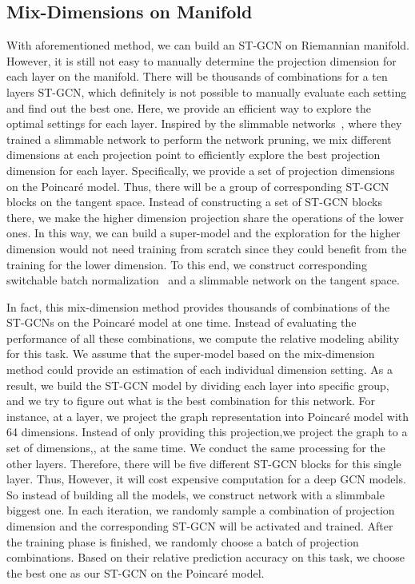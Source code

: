 \documentclass[letterpaper]{article} \usepackage{aaai19}  \usepackage{times}  \usepackage{helvet} \usepackage{courier}  \usepackage[hyphens]{url}  \usepackage{graphicx} \urlstyle{rm} \def\UrlFont{\rm}  \usepackage{graphicx}  \frenchspacing  \setlength{\pdfpagewidth}{8.5in}  \setlength{\pdfpageheight}{11in}
\begin{document}
\subsection{Mix-Dimensions on Manifold}

With aforementioned method, we can build an ST-GCN on Riemannian manifold. However, it is still not easy to manually determine the projection dimension for each layer on the manifold. There will be thousands of combinations for a ten layers ST-GCN, which definitely is not possible to manually evaluate each setting and find out the best one. Here, we provide an efficient way to explore the optimal settings for each layer. Inspired by the slimmable networks~\cite{yu2018slimmable}, where they trained a slimmable network to perform the network pruning, we mix different dimensions at each projection point to efficiently explore the best projection dimension for each layer. Specifically, we provide a set of projection dimensions on the Poincar\'e model. Thus, there will be a group of corresponding ST-GCN blocks on the tangent space. Instead of constructing a set of ST-GCN blocks there, we make the higher dimension projection share the operations of the lower ones. In this way, we can build a super-model and the exploration for the higher dimension would not need training from scratch since they could benefit from the training for the lower dimension. To this end, we construct corresponding switchable batch normalization~\cite{yu2018slimmable} and a slimmable network on the tangent space.

In fact, this mix-dimension method provides thousands of combinations of the ST-GCNs on the Poincar\'e model at one time. Instead of evaluating the performance of all these combinations, we compute the relative modeling ability for this task. We assume that the super-model based on the mix-dimension method could provide an estimation of each individual dimension setting. As a result, we build the ST-GCN model by dividing each layer into specific group, and we try to figure out what is the best combination for this network. For instance, at a layer, we project the graph representation into Poincar\'e model with 64 dimensions. Instead of only providing this projection,we project the graph to a set of dimensions,, at the same time. We conduct the same processing for the other layers. Therefore, there will be five different ST-GCN blocks for this single layer. Thus, However, it will cost expensive computation for a deep GCN models. So instead of building all the models, we construct network with a slimmbale biggest one. In each iteration, we randomly sample a combination of projection dimension and the corresponding ST-GCN will be activated and trained. After the training phase is finished, we randomly choose a batch of projection combinations. Based on their relative prediction accuracy on this task, we choose the best one as our ST-GCN on the Poincar\'e model. 
\end{document}
